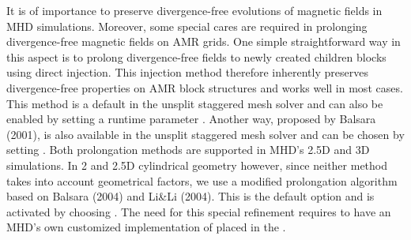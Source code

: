 \begin{flashtip}
It is of importance to preserve divergence-free evolutions of magnetic fields in MHD
simulations. Moreover, some special cares are required in prolonging 
divergence-free magnetic fields on AMR grids. One simple straightforward way
in this aspect is to prolong divergence-free fields to newly created children
blocks using direct injection. This injection method therefore inherently 
preserves divergence-free properties on AMR block structures 
and works well in most cases. This method is a default in the unsplit staggered mesh
solver and can also be enabled by setting a runtime parameter
. Another way, proposed by Balsara (2001), is also
available in the unsplit staggered mesh solver and can be chosen by setting .
Both prolongation methods are supported in MHD's 2.5D and 3D simulations.
In 2 and 2.5D cylindrical geometry however, since neither method takes into account
geometrical factors, we use a modified prolongation algorithm based on
Balsara (2004) and Li\&Li (2004). This is the default option and is
activated by choosing .
The need for this special refinement requires to have an MHD's own customized
implementation of  placed in the 
.
\end{flashtip}
